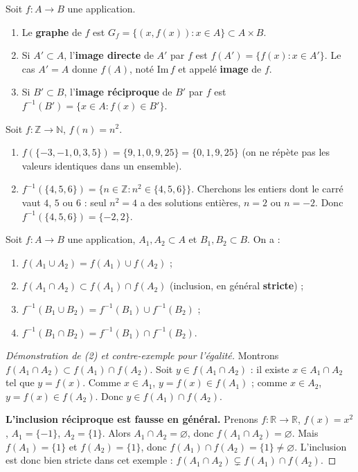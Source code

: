 \documentclass[a4paper,12pt,openany]{book}
\begin{document}
\begin{definition}
Soit $f : A \to B$ une application.
\begin{enumerate}
  \item Le \textbf{graphe} de $f$ est $G_f = \{(x,f(x)) : x \in A\} \subset
  A\times B$.
  \item Si $A' \subset A$, l'\textbf{image directe} de $A'$ par $f$ est
  $f(A') = \{f(x) : x \in A'\}$. Le cas $A'=A$ donne
  $f(A)$, noté $\mathrm{Im}\,f$ et appelé \textbf{image} de $f$.
  \item Si $B' \subset B$, l'\textbf{image réciproque} de $B'$ par $f$ est
  $f^{-1}(B') = \{x \in A : f(x) \in B'\}$.
\end{enumerate}
\end{definition}


\begin{exemple}[3.2]
Soit $f : \mathbb{Z} \to \mathbb{N}$, $f(n) = n^2$.
\begin{enumerate}
  \item $f(\{-3,-1,0,3,5\}) = \{9,1,0,9,25\} = \{0,1,9,25\}$ (on ne répète
  pas les valeurs identiques dans un ensemble).
  \item $f^{-1}(\{4,5,6\}) = \{n \in \mathbb{Z} : n^2 \in \{4,5,6\}\}$.
  Cherchons les entiers dont le carré vaut $4$, $5$ ou $6$ : seul $n^2=4$ a
  des solutions entières, $n=2$ ou $n=-2$. Donc $f^{-1}(\{4,5,6\}) =
  \{-2,2\}$.
\end{enumerate}
\end{exemple}

\begin{proposition}
Soit $f : A \to B$ une application, $A_1,A_2 \subset A$ et $B_1,B_2\subset B$.
On a :
\begin{enumerate}[label=(\arabic*)]
  \item $f(A_1 \cup A_2) = f(A_1) \cup f(A_2)$ ;
  \item $f(A_1 \cap A_2) \subset f(A_1) \cap f(A_2)$ (inclusion, en général
  \textbf{stricte}) ;
  \item $f^{-1}(B_1 \cup B_2) = f^{-1}(B_1) \cup f^{-1}(B_2)$ ;
  \item $f^{-1}(B_1 \cap B_2) = f^{-1}(B_1) \cap f^{-1}(B_2)$.
\end{enumerate}
\end{proposition}

\begin{proof}[Démonstration de (2) et contre-exemple pour l'égalité]
Montrons $f(A_1\cap A_2) \subset f(A_1)\cap f(A_2)$. Soit $y \in f(A_1\cap
A_2)$ : il existe $x \in A_1 \cap A_2$ tel que $y=f(x)$. Comme $x\in A_1$,
$y=f(x) \in f(A_1)$ ; comme $x \in A_2$, $y=f(x)\in f(A_2)$. Donc $y \in
f(A_1)\cap f(A_2)$.

\textbf{L'inclusion réciproque est fausse en général.} Prenons $f:\mathbb{R}
\to \mathbb{R}$, $f(x)=x^2$, $A_1=\{-1\}$, $A_2=\{1\}$. Alors $A_1\cap
A_2=\varnothing$, donc $f(A_1\cap A_2)=\varnothing$. Mais $f(A_1)=\{1\}$ et
$f(A_2)=\{1\}$, donc $f(A_1)\cap f(A_2)=\{1\} \neq \varnothing$. L'inclusion
est donc bien stricte dans cet exemple : $f(A_1\cap A_2) \subsetneq
f(A_1)\cap f(A_2)$.
\end{proof}
\end{document}
